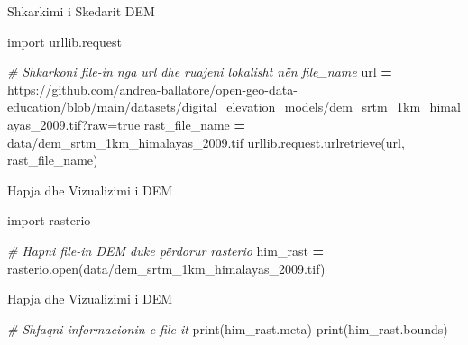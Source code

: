 \documentclass[
  ignorenonframetext,
]{beamer}
\newenvironment{Shaded}{\begin{snugshade}}{\end{snugshade}}
\newcommand{\BuiltInTok}[1]{#1}
\newcommand{\CommentTok}[1]{\textcolor[rgb]{0.56,0.35,0.01}{\textit{#1}}}
\newcommand{\ImportTok}[1]{#1}
\newcommand{\NormalTok}[1]{#1}
\newcommand{\OperatorTok}[1]{\textcolor[rgb]{0.81,0.36,0.00}{\textbf{#1}}}
\newcommand{\StringTok}[1]{\textcolor[rgb]{0.31,0.60,0.02}{#1}}
\begin{document}
\begin{frame}[fragile]{Shkarkimi i Skedarit DEM}
\protect\hypertarget{shkarkimi-i-skedarit-dem-1}{}

\begin{Shaded}
\begin{Highlighting}[]
\ImportTok{import}\NormalTok{ urllib.request}

\CommentTok{\# Shkarkoni file{-}in nga \textquotesingle{}url\textquotesingle{} dhe ruajeni lokalisht nën \textquotesingle{}file\_name\textquotesingle{}}
\NormalTok{url }\OperatorTok{=} \StringTok{\textquotesingle{}https://github.com/andrea{-}ballatore/open{-}geo{-}data{-}education/blob/main/datasets/digital\_elevation\_models/dem\_srtm\_1km\_himalayas\_2009.tif?raw=true\textquotesingle{}}
\NormalTok{rast\_file\_name }\OperatorTok{=} \StringTok{\textquotesingle{}data/dem\_srtm\_1km\_himalayas\_2009.tif\textquotesingle{}}
\NormalTok{urllib.request.urlretrieve(url, rast\_file\_name)}
\end{Highlighting}
\end{Shaded}
\end{frame}

\begin{frame}[fragile]{Hapja dhe Vizualizimi i DEM}
\protect\hypertarget{hapja-dhe-vizualizimi-i-dem}{}

\begin{Shaded}
\begin{Highlighting}[]
\ImportTok{import}\NormalTok{ rasterio}

\CommentTok{\# Hapni file{-}in DEM duke përdorur rasterio}
\NormalTok{him\_rast }\OperatorTok{=}\NormalTok{ rasterio.}\BuiltInTok{open}\NormalTok{(}\StringTok{\textquotesingle{}data/dem\_srtm\_1km\_himalayas\_2009.tif\textquotesingle{}}\NormalTok{)}
\end{Highlighting}
\end{Shaded}
\end{frame}

\begin{frame}[fragile]{Hapja dhe Vizualizimi i DEM}
\protect\hypertarget{hapja-dhe-vizualizimi-i-dem-1}{}

\begin{Shaded}
\begin{Highlighting}[]
\CommentTok{\# Shfaqni informacionin e file{-}it}
\BuiltInTok{print}\NormalTok{(him\_rast.meta)}
\BuiltInTok{print}\NormalTok{(him\_rast.bounds)}
\end{Highlighting}
\end{Shaded}
\end{frame}
\end{document}
